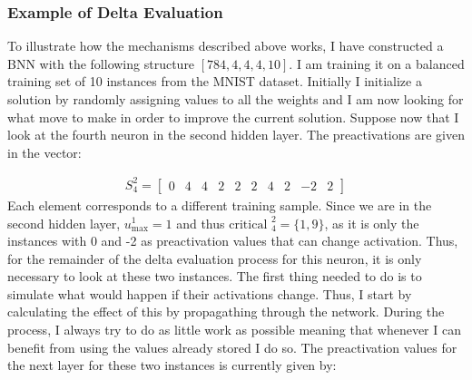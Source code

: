 \subsubsection{Example of Delta Evaluation}
To illustrate how the mechanisms described above works, I have constructed a BNN with the following structure $[784, 4, 4, 4, 10]$. I am training it on a balanced training set of 10 instances from the MNIST dataset. Initially I initialize a solution by randomly assigning values to all the weights and I am now looking for what move to make in order to improve the current solution. Suppose now that I look at the fourth neuron in the second hidden layer. The preactivations are given in the vector:

\begin{align*}
    S_4^2 = 
    \begin{bmatrix}
        0 & 4 & 4 & 2 & 2 & 2 & 4 & 2 & -2 & 2
    \end{bmatrix}
\end{align*}
Each element corresponds to a different training sample. Since we are in the second hidden layer, $u^1_{\max} = 1$ and thus $\text{critical }_4 ^2 = \{1, 9\}$, as it is only the instances with 0 and -2 as preactivation values that can change activation. Thus, for the remainder of the delta evaluation process for this neuron, it is only necessary to look at these two instances. The first thing needed to do is to simulate what would happen if their activations change. Thus, I start by calculating the effect of this by propagathing through the network. During the process, I always try to do as little work as possible meaning that whenever I can benefit from using the values already stored I do so. The preactivation values for the next layer for these two instances is currently given by:

